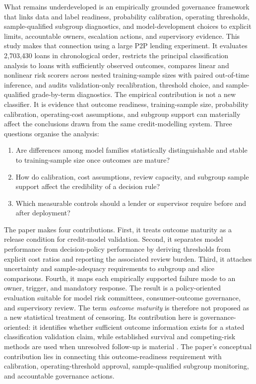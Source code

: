 \documentclass[10pt]{article}
\begin{document}
What remains underdeveloped is an empirically grounded governance framework that links data and label readiness, probability calibration, operating thresholds, sample-qualified subgroup diagnostics, and model-development choices to explicit limits, accountable owners, escalation actions, and supervisory evidence. This study makes that connection using a large P2P lending experiment. It evaluates 2,703,430 loans in chronological order, restricts the principal classification analysis to loans with sufficiently observed outcomes, compares linear and nonlinear risk scorers across nested training-sample sizes with paired out-of-time inference, and audits validation-only recalibration, threshold choice, and sample-qualified grade-by-term diagnostics. The empirical contribution is not a new classifier. It is evidence that outcome readiness, training-sample size, probability calibration, operating-cost assumptions, and subgroup support can materially affect the conclusions drawn from the same credit-modelling system. Three questions organise the analysis:

\begin{enumerate}
\item Are differences among model families statistically distinguishable and stable to training-sample size once outcomes are mature?
\item How do calibration, cost assumptions, review capacity, and subgroup sample support affect the credibility of a decision rule?
\item Which measurable controls should a lender or supervisor require before and after deployment?
\end{enumerate}

The paper makes four contributions. First, it treats outcome maturity as a release condition for credit-model validation. Second, it separates model performance from decision-policy performance by deriving thresholds from explicit cost ratios and reporting the associated review burden. Third, it attaches uncertainty and sample-adequacy requirements to subgroup and slice comparisons. Fourth, it maps each empirically supported failure mode to an owner, trigger, and mandatory response. The result is a policy-oriented evaluation suitable for model risk committees, consumer-outcome governance, and supervisory review. The term \emph{outcome maturity} is therefore not proposed as a new statistical treatment of censoring. Its contribution here is governance-oriented: it identifies whether sufficient outcome information exists for a stated classification validation claim, while established survival and competing-risk methods are used when unresolved follow-up is material \cite{ref49,ref50,ref51,ref52}. The paper's conceptual contribution lies in connecting this outcome-readiness requirement with calibration, operating-threshold approval, sample-qualified subgroup monitoring, and accountable governance actions.
\end{document}
